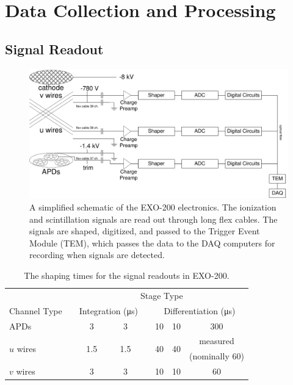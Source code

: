 \documentclass[herrin-thesis.tex]{subfiles}
\begin{document}
\chapter{Data Collection and Processing}
\label{ch:data}

\section{Signal Readout}
\label{sec:data_signal_readout}
\begin{figure}
\centering
\includegraphics[width=\textwidth]{./figures/data_simplified_electronics.pdf}
\caption[The EXO-200 electronics]{A simplified schematic of the EXO-200 electronics. The ionization and scintillation signals are read out through long flex cables. The signals are shaped, digitized, and passed to the Trigger Event Module (TEM), which passes the data to the DAQ computers for recording when signals are detected.}
\label{fig:data_simplified_electronics}
\end{figure}

\begin{table}[tbp]
\centering
\caption[Electronic shaping times]{The shaping times for the signal readouts in EXO-200.}
\label{tab:data_shaping_times}
\begin{tabular}{l c @{\hskip 20pt} c c c @{\hskip 20pt} c c c}\toprule
							&&						\multicolumn{6}{c}{Stage Type}													\\\cmidrule{3-8}
	Channel Type				&&	\multicolumn{2}{c}{Integration (\si{\micro\s})}	&&	\multicolumn{3}{c}{Differentiation (\si{\micro\s})}				\\\midrule
	APDs					&&	3				&		3			&&	10				&	10				&	300			\\
	\multirow{2}{*}{\(u\) wires}		&&	\multirow{2}{*}{1.5}	&	\multirow{2}{*}{1.5}	&&	\multirow{2}{*}{40}	&	\multirow{2}{*}{40}	& 	measured 	\\
							&&					&					&&					&					& 	(nominally 60)	\\
	\(v\) wires					&&	3				&		3			&&	10				&	10				&	60			\\\bottomrule
\end{tabular}
\end{table}
\end{document}
